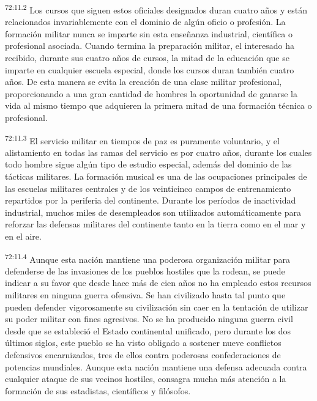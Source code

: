 \documentclass[twoside, 11pt]{book}
\begin{document}
\par
\textsuperscript{72:11.2} Los cursos que siguen estos oficiales designados duran cuatro años y están relacionados invariablemente con el dominio de algún oficio o profesión. La formación militar nunca se imparte sin esta enseñanza industrial, científica o profesional asociada. Cuando termina la preparación militar, el interesado ha recibido, durante sus cuatro años de cursos, la mitad de la educación que se imparte en cualquier escuela especial, donde los cursos duran también cuatro años. De esta manera se evita la creación de una clase militar profesional, proporcionando a una gran cantidad de hombres la oportunidad de ganarse la vida al mismo tiempo que adquieren la primera mitad de una formación técnica o profesional.

\par
\textsuperscript{72:11.3} El servicio militar en tiempos de paz es puramente voluntario, y el alistamiento en todas las ramas del servicio es por cuatro años, durante los cuales todo hombre sigue algún tipo de estudio especial, además del dominio de las tácticas militares. La formación musical es una de las ocupaciones principales de las escuelas militares centrales y de los veinticinco campos de entrenamiento repartidos por la periferia del continente. Durante los períodos de inactividad industrial, muchos miles de desempleados son utilizados automáticamente para reforzar las defensas militares del continente tanto en la tierra como en el mar y en el aire.

\par
\textsuperscript{72:11.4} Aunque esta nación mantiene una poderosa organización militar para defenderse de las invasiones de los pueblos hostiles que la rodean, se puede indicar a su favor que desde hace más de cien años no ha empleado estos recursos militares en ninguna guerra ofensiva. Se han civilizado hasta tal punto que pueden defender vigorosamente su civilización sin caer en la tentación de utilizar su poder militar con fines agresivos. No se ha producido ninguna guerra civil desde que se estableció el Estado continental unificado, pero durante los dos últimos siglos, este pueblo se ha visto obligado a sostener nueve conflictos defensivos encarnizados, tres de ellos contra poderosas confederaciones de potencias mundiales. Aunque esta nación mantiene una defensa adecuada contra cualquier ataque de sus vecinos hostiles, consagra mucha más atención a la formación de sus estadistas, científicos y filósofos.
\end{document}
